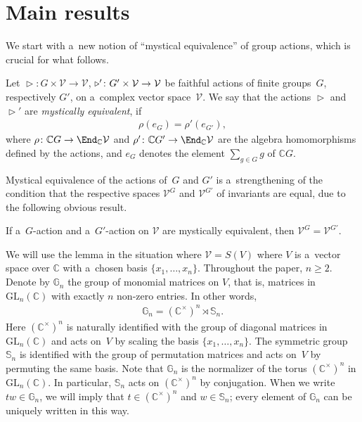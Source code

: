 \section{Main results}
\label{sect:main}

We start with a~new notion of ``mystical equivalence'' of group actions, which is crucial for what follows.

\begin{Definition}
Let $ \mathop{\triangleright}\nolimits\colon G \times \mathcal V\to \mathcal V$,
$\mathop{\triangleright}\nolimits\nolimits'\colon G' \times \mathcal V\to \mathcal V $ be faithful actions of f\/inite
groups~$G$, respectively $G'$, on a~complex vector space~$\mathcal V$.
We say that the actions $\mathop{\triangleright}\nolimits$ and $\mathop{\triangleright}\nolimits'$ are
\textit{mystically equivalent}, if
\begin{gather*}
\rho(e_G)=\rho'(e_{G'}),
\end{gather*}
where $\rho\colon \mathbb C G \to \End_\mathbb C \mathcal V$ and $\rho'\colon \mathbb C G'\to \End_\mathbb C\mathcal V$
are the algebra homomorphisms def\/ined by the actions, and $e_G$ denotes the element $\sum\limits_{g\in G}g$ of $\mathbb C G$.
\end{Definition}

Mystical equivalence of the actions of~$G$ and $G'$ is a~strengthening of the condition that the respective spaces
$\mathcal V^G$ and $\mathcal V^{G'}$ of invariants are equal, due to the following obvious result.
\begin{Lemma}%
If a~$G$-action and a~$G'$-action on $\mathcal V$ are mystically equivalent, then $\mathcal V^G=\mathcal V^{G'}$.
\end{Lemma}

We will use the lemma in the situation where $\mathcal V = S(V)$ where $V$ is a~vector space over $\mathbb C$ with
a~chosen basis $\{x_1,\ldots,x_n\}$.
Throughout the paper, $n\ge 2$.
Denote by $\mathbb G_n$ the group of monomial matrices on $V$, that is, matrices in $\mathrm{GL}_n(\mathbb C)$ with
exactly $n$ non-zero entries.
In other words,
\begin{gather*}
\mathbb G_n=(\mathbb C^\times)^n\rtimes \mathbb S_n.
\end{gather*}
Here $(\mathbb C^\times)^n$ is naturally identif\/ied with the group of diagonal matrices in $\mathrm{GL}_n(\mathbb C)$
and acts on~$V$ by scaling the basis $\{x_1,\ldots,x_n\}$.
The symmetric group $\mathbb S_n$ is identif\/ied with the group of permutation matrices and acts on~$V$ by permuting the
same basis.
Note that $\mathbb G_n$ is the normalizer of the torus $(\mathbb C^\times)^n$ in $\mathrm{GL}_n(\mathbb C)$.
In particular, $\mathbb S_n$ acts on $(\mathbb C^\times)^n$ by conjugation.
When we write $tw\in \mathbb G_n$, we will imply that $t\in (\mathbb C^\times)^n$ and $w\in \mathbb S_n$; every element
of $\mathbb G_n$ can be uniquely written in this way.


